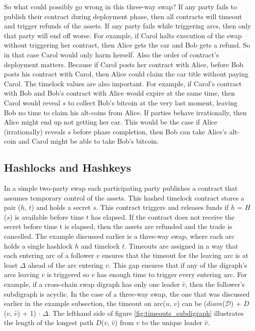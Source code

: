 So what could possibly go wrong in this three-way swap? If any party fails to publish their contract during deployment phase, then all contracts will timeout and trigger refunds of the assets. If any party fails while triggering arcs, then only that party will end off worse. For example, if Carol halts execution of the swap without triggering her contract, then Alice gets the car and Bob gets a refund. So in that case Carol would only harm herself. Also the order of contract's deployment matters. Because if Carol posts her contract with Alice, before Bob posts his contract with Carol, then Alice could claim the car title without paying Carol. The timelock values are also important. For example, if Carol's contract with Bob and Bob's contract with Alice would expire at the same time, then Carol would reveal $s$ to collect Bob's bitcoin at the very last moment, leaving Bob no time to claim his alt-coins from Alice. If parties behave irrationally, then Alice might end up not getting her car. This would be the case if Alice (irrationally) reveals $s$ before phase completion, then Bob can take Alice's alt-coin and Carol might be able to take Bob's bitcoin.


\subsection{Hashlocks and Hashkeys}
\label{subsec:background:second_section:hashlock_timelock}
In a simple two-party swap each participating party publishes a contract that assumes temporary control of the assets. This hashed timelock contract  stores a pair ($h$, $t$) and holds a secret $s$. This contract triggers and releases funds if $h$ = $H$($s$) is available before time $t$ has elapsed. If the contract does not receive the secret before time t is elapsed, then the assets are refunded and the trade is cancelled. The example discussed earlier is a three-way swap, where each arc holds a single hashlock $h$ and timelock $t$. Timeouts are assigned in a way that each entering arc of a follower $v$ ensures that the timeout for the leaving arc is at least $\Delta$ ahead of the arc entering $v$. This gap ensures that if any of the digraph's arcs leaving $v$ is triggered so $v$ has enough time to trigger every entering arc. For example, if a cross-chain swap digraph has only one leader $\hat{v}$, then the follower's subdigraph is acyclic. In the case of a three-way swap, the one that was discussed earlier in the example subsection, the timeout on arc($u$, $v$) can be ($diam$($\mathcal{D}$) + $D$($v$, $\hat{v}$) + 1) $\cdot$ $\Delta$. The lefthand side of figure \ref{fig:timeouts_subdigraph} illustrates the length of the longest path $D$($v$, $\hat{v}$) from $v$ to the unique leader $\hat{v}$.



